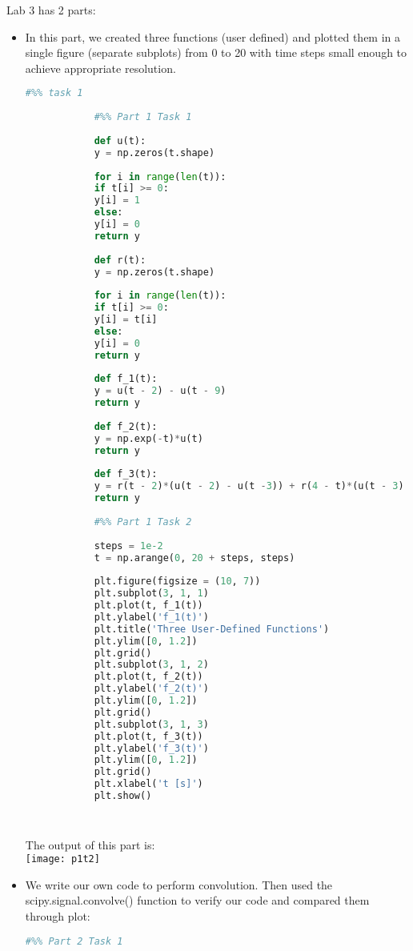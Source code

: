 \documentclass[11pt,a4]{article}
\begin{document}
	Lab 3 has 2 parts:
	\begin{itemize}
		\item
		
		In this part, we created three functions (user defined) and plotted them in a single figure (separate subplots) from 0 to 20 with time steps small enough to achieve appropriate resolution.
		\begin{lstlisting}[language=Python]
			#%% task 1
			
			#%% Part 1 Task 1
			
			def u(t):
			y = np.zeros(t.shape)
			
			for i in range(len(t)):
			if t[i] >= 0:
			y[i] = 1
			else:
			y[i] = 0
			return y
			
			def r(t):
			y = np.zeros(t.shape)
			
			for i in range(len(t)):
			if t[i] >= 0:
			y[i] = t[i]
			else:
			y[i] = 0
			return y
			
			def f_1(t):
			y = u(t - 2) - u(t - 9)
			return y
			
			def f_2(t):
			y = np.exp(-t)*u(t)
			return y
			
			def f_3(t):
			y = r(t - 2)*(u(t - 2) - u(t -3)) + r(4 - t)*(u(t - 3) - u(t - 4))
			return y
			
			#%% Part 1 Task 2
			
			steps = 1e-2
			t = np.arange(0, 20 + steps, steps)
			
			plt.figure(figsize = (10, 7))
			plt.subplot(3, 1, 1)
			plt.plot(t, f_1(t))
			plt.ylabel('f_1(t)')
			plt.title('Three User-Defined Functions')
			plt.ylim([0, 1.2])
			plt.grid()
			plt.subplot(3, 1, 2)
			plt.plot(t, f_2(t))
			plt.ylabel('f_2(t)')
			plt.ylim([0, 1.2])
			plt.grid()
			plt.subplot(3, 1, 3)
			plt.plot(t, f_3(t))
			plt.ylabel('f_3(t)')
			plt.ylim([0, 1.2])
			plt.grid()
			plt.xlabel('t [s]')
			plt.show()
			
			
		\end{lstlisting}
		
		The output of this part is:\\
		\texttt{[image: p1t2]}\\   
		
		\item
		We write our own code to perform convolution. Then used the scipy.signal.convolve() function to verify our code and compared them through plot:\\
		\begin{lstlisting}[language=Python]
			#%% Part 2 Task 1
			

\end{lstlisting}
\end{itemize}
\end{document}
